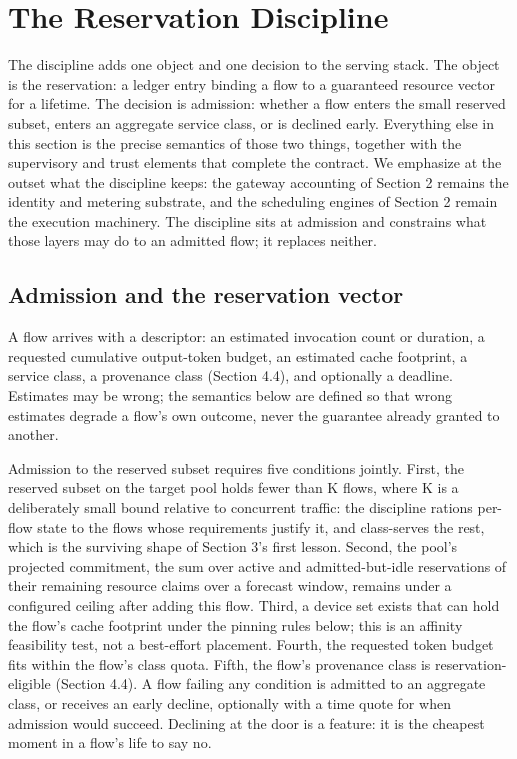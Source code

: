 \section{The Reservation Discipline}

The discipline adds one object and one decision to the serving stack. The
object is the reservation: a ledger entry binding a flow to a guaranteed
resource vector for a lifetime. The decision is admission: whether a flow
enters the small reserved subset, enters an aggregate service class, or is
declined early. Everything else in this section is the precise semantics
of those two things, together with the supervisory and trust elements that
complete the contract. We emphasize at the outset what the discipline
keeps: the gateway accounting of Section 2 remains the identity and
metering substrate, and the scheduling engines of Section 2 remain the
execution machinery. The discipline sits at admission and constrains what
those layers may do to an admitted flow; it replaces neither.

\subsection{Admission and the reservation vector}

A flow arrives with a descriptor: an estimated invocation count or
duration, a requested cumulative output-token budget, an estimated cache
footprint, a service class, a provenance class (Section 4.4), and
optionally a deadline. Estimates may be wrong; the semantics below are
defined so that wrong estimates degrade a flow's own outcome, never the
guarantee already granted to another.

Admission to the reserved subset requires five conditions jointly. First,
the reserved subset on the target pool holds fewer than K flows, where K
is a deliberately small bound relative to concurrent traffic: the
discipline rations per-flow state to the flows whose requirements justify
it, and class-serves the rest, which is the surviving shape of Section
3's first lesson. Second, the pool's projected commitment, the sum over
active and admitted-but-idle reservations of their remaining resource
claims over a forecast window, remains under a configured ceiling after
adding this flow. Third, a device set exists that can hold the flow's
cache footprint under the pinning rules below; this is an affinity
feasibility test, not a best-effort placement. Fourth, the requested
token budget fits within the flow's class quota. Fifth, the flow's
provenance class is reservation-eligible (Section 4.4). A flow failing
any condition is admitted to an aggregate class, or receives an early
decline, optionally with a time quote for when admission would succeed.
Declining at the door is a feature: it is the cheapest moment in a flow's
life to say no.

